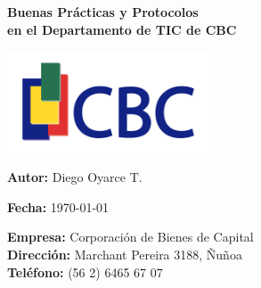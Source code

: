 \documentclass{article}
\begin{document}
\begin{titlepage}
    \centering
    \vspace*{1cm}
    
    \Huge\textbf{Buenas Prácticas y Protocolos\\ en el Departamento de TIC de CBC}
    
    \vspace{2cm}
    
    \includegraphics[width=6cm]{logo-cbc-home-lg.png} %
    
    \vspace{2cm}
    
    \Large\textbf{Autor:} Diego Oyarce T.
    
    \vspace{1cm}
    
    \Large\textbf{Fecha:} \today
    
    \vfill
    
    \small
    \textbf{Empresa:} Corporación de Bienes de Capital \\
    \textbf{Dirección:} Marchant Pereira 3188, Ñuñoa \\
    \textbf{Teléfono:} (56 2) 6465 67 07\\
    
\end{titlepage}
\end{document}
